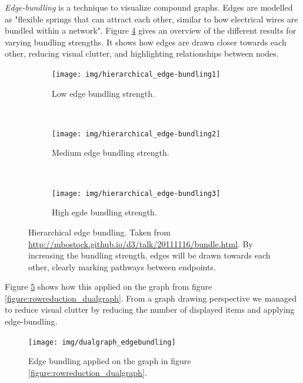 \emph{Edge-bundling} is a technique to visualize compound graphs\cite{Holten:2006:HEB:1187627.1187772}. Edges are modelled as "flexible springs that can attract each other, similar to how electrical wires are bundled within a network"\cite{holten:2009}. Figure \ref{figure:hierarchical_edge_bundling} gives an overview of the different results for varying bundling strengths. It shows how edges are drawn closer towards each other, reducing visual clutter, and highlighting relationships between nodes.


\begin{figure}
	\centering
	\begin{subfigure}[b]{0.3\textwidth}
					\centering
					\texttt{[image: img/hierarchical\_edge-bundling1]}
					\caption{Low edge bundling strength.}
					\label{figure:hierarchical_edge-bundling1}
	\end{subfigure}%
	~
	\begin{subfigure}[b]{0.3\textwidth}
					\centering
					\texttt{[image: img/hierarchical\_edge-bundling2]}
					\caption{Medium edge bundling strength.}
					\label{figure:hierarchical_edge-bundling2}
	\end{subfigure}
	~
	\begin{subfigure}[b]{0.3\textwidth}
					\centering
					\texttt{[image: img/hierarchical\_edge-bundling3]}
					\caption{High egde bundling strength.}
					\label{figure:hierarchical_edge-bundling3}
	\end{subfigure}
	\caption{Hierarchical edge bundling. Taken from \url{http://mbostock.github.io/d3/talk/20111116/bundle.html}. By increasing the bundling strength, edges will be drawn towards each other, clearly marking pathways between endpoints.}%
	\label{figure:hierarchical_edge_bundling}%
\end{figure}


Figure \ref{figure:edgebundling_dualgraph} shows how this applied on the graph from figure \ref{figure:rowreduction_dualgraph}. From a graph drawing perspective we managed to reduce visual clutter by reducing the number of displayed items and applying edge-bundling\cite{herman:2000, Holten:2006:HEB:1187627.1187772}.

\begin{figure}%
	\begin{center}
		\texttt{[image: img/dualgraph\_edgebundling]}%
	\end{center}
	\caption{Edge bundling applied on the graph in figure \ref{figure:rowreduction_dualgraph}.}%
	\label{figure:edgebundling_dualgraph}%
\end{figure}










